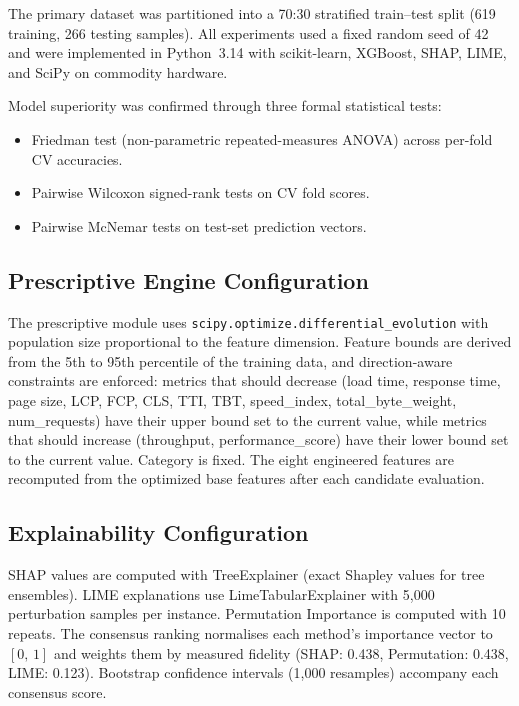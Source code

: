 \documentclass[sn-nature]{sn-jnl}
\begin{document}
The primary dataset was partitioned into a 70:30 stratified train--test split (619 training, 266 testing samples). All experiments used a fixed random seed of 42 and were implemented in Python~3.14 with scikit-learn, XGBoost, SHAP, LIME, and SciPy on commodity hardware.

Model superiority was confirmed through three formal statistical tests:
\begin{itemize}
    \item Friedman test (non-parametric repeated-measures ANOVA) across per-fold CV accuracies.
    \item Pairwise Wilcoxon signed-rank tests on CV fold scores.
    \item Pairwise McNemar tests on test-set prediction vectors.
\end{itemize}

\subsection{Prescriptive Engine Configuration}

The prescriptive module uses \texttt{scipy.optimize.differential\_evolution} with population size proportional to the feature dimension. Feature bounds are derived from the 5th to 95th percentile of the training data, and direction-aware constraints are enforced: metrics that should decrease (load time, response time, page size, LCP, FCP, CLS, TTI, TBT, speed\_index, total\_byte\_weight, num\_requests) have their upper bound set to the current value, while metrics that should increase (throughput, performance\_score) have their lower bound set to the current value. Category is fixed. The eight engineered features are recomputed from the optimized base features after each candidate evaluation.

\subsection{Explainability Configuration}

SHAP values are computed with TreeExplainer (exact Shapley values for tree ensembles). LIME explanations use LimeTabularExplainer with 5,000 perturbation samples per instance. Permutation Importance is computed with 10 repeats. The consensus ranking normalises each method's importance vector to $[0,\,1]$ and weights them by measured fidelity (SHAP: 0.438, Permutation: 0.438, LIME: 0.123). Bootstrap confidence intervals (1,000 resamples) accompany each consensus score.
\end{document}
